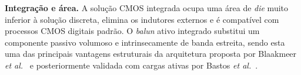 \textbf{Integração e área.} A solução CMOS integrada ocupa uma área de \textit{die} muito inferior à
solução discreta, elimina os indutores externos e é compatível com processos CMOS digitais padrão.
O \textit{balun} ativo integrado substitui um componente passivo volumoso e intrinsecamente de banda
estreita, sendo esta uma das principais vantagens estruturais da arquitetura proposta por Blaakmeer
\textit{et al.}~\cite{blaakmeer2008} e posteriormente validada com cargas ativas por Bastos
\textit{et al.}~\cite{bastos2014}.